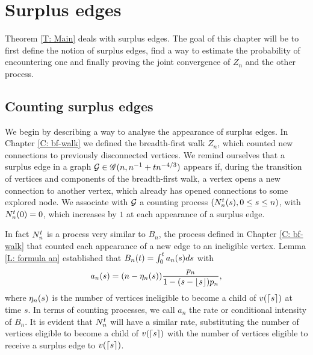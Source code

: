
\chapter{Surplus edges}

Theorem \ref{T: Main} deals with surplus edges.
The goal of this chapter will be to first define the notion of surplus edges,
find a way to estimate the probability of encountering one and finally proving the joint convergence of $Z_n$ and the other process.

\section{Counting surplus edges}

We begin by describing a way to analyse the appearance of surplus edges.
In Chapter \ref{C: bf-walk} we defined the breadth-first walk $Z_n$, 
which counted new connections to previously disconnected vertices.
We remind ourselves that a surplus edge in a graph $\mathcal{G} \in \mathscr{G}(n, n^{-1} + tn^{-4/3})$ appears if,
during the transition of vertices and components of the breadth-first walk,
a vertex opens a new connection to another vertex, 
which already has opened connections to some explored node.
We associate with $\mathcal{G}$ a counting process $(N_n^t(s), 0 \leq s \leq n)$,
with $N_n^t(0) = 0$, which increases by $1$ at each appearance of a surplus edge.

In fact $N_n^t$ is a process very similar to $B_n$,
the process defined in Chapter \ref{C: bf-walk} that counted each appearance of a new edge to an ineligible vertex.
Lemma \ref{L: formula an} established that $B_n(t) = \int_{0}^{t} a_n(s)ds$ with
\begin{equation*}
	a_n(s) = (n - \eta_n(s)) \frac{p_n}{1-(s-\lfloor s\rfloor)p_n},
\end{equation*}
where $\eta_n(s)$ is the number of vertices ineligible to become a child of $v(\lceil s\rceil)$ at time $s$.
In terms of counting processes, we call $a_n$ the rate or conditional intensity of $B_n$.
It is evident that $N_n^t$ will have a similar rate,
substituting the number of vertices eligible to become a child of $v(\lceil s\rceil)$ with the number of vertices eligible to receive a surplus edge to $v(\lceil s\rceil)$.

